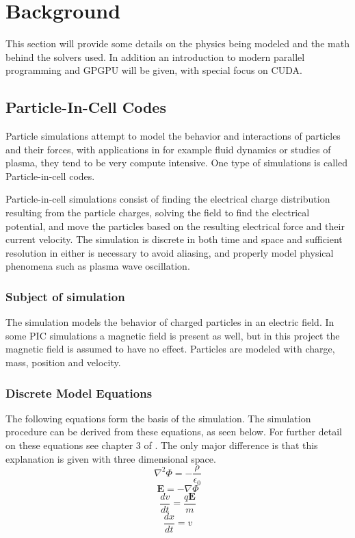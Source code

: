 \chapter{Background}
This section will provide some details on the physics being modeled and the math behind the solvers used. In addition an
introduction to modern parallel programming and GPGPU will be given, with special focus on CUDA.

\section{Particle-In-Cell Codes}
Particle simulations attempt to model the behavior and interactions of particles and their forces, with applications in
for example fluid dynamics or studies of plasma, they tend to be very compute intensive. One type of simulations is
called Particle-in-cell codes.

Particle-in-cell simulations consist of finding the electrical charge distribution resulting from the particle charges,
solving the field to find the electrical potential, and move the particles based on the resulting electrical force and
their current velocity. The simulation is discrete in both time and space and sufficient resolution in either is
necessary to avoid aliasing, and properly model physical phenomena such as plasma wave oscillation.

\subsection{Subject of simulation}
The simulation models the behavior of charged particles in an electric field. In some PIC simulations a magnetic field
is present as well, but in this project the magnetic field is assumed to have no effect. Particles are modeled with
charge, mass, position and velocity.

\subsection{Discrete Model Equations}
The following equations form the basis of the simulation. The simulation procedure can be derived from these equations,
as seen below. For further detail on these equations see chapter 3 of \cite{elster94}. The only major difference is that
this explanation is given with three dimensional space.
\begin{equation} \label{eq:dm1} \nabla^2\Phi = -\frac{\rho}{\epsilon _0} \end{equation}
\begin{equation} \label{eq:dm2} \mathbf{E} = -\nabla\Phi \end{equation}
\begin{equation} \label{eq:dm3} \frac{dv}{dt} =\frac{q\mathbf{E}}{m} \end{equation}
\begin{equation} \label{eq:dm4} \frac{dx}{dt} = v \end{equation}

